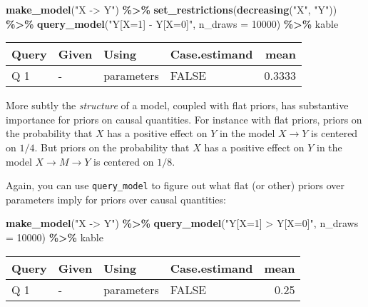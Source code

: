 \documentclass[
  12pt,
]{book}
\newenvironment{Shaded}{\begin{snugshade}}{\end{snugshade}}
\newcommand{\AttributeTok}[1]{\textcolor[rgb]{0.13,0.29,0.53}{#1}}
\newcommand{\DecValTok}[1]{\textcolor[rgb]{0.00,0.00,0.81}{#1}}
\newcommand{\FunctionTok}[1]{\textcolor[rgb]{0.13,0.29,0.53}{\textbf{#1}}}
\newcommand{\NormalTok}[1]{#1}
\newcommand{\SpecialCharTok}[1]{\textcolor[rgb]{0.81,0.36,0.00}{\textbf{#1}}}
\newcommand{\StringTok}[1]{\textcolor[rgb]{0.31,0.60,0.02}{#1}}
\begin{document}
\begin{Shaded}
\begin{Highlighting}[]
\FunctionTok{make\_model}\NormalTok{(}\StringTok{"X {-}\textgreater{} Y"}\NormalTok{) }\SpecialCharTok{\%\textgreater{}\%}
  \FunctionTok{set\_restrictions}\NormalTok{(}\FunctionTok{decreasing}\NormalTok{(}\StringTok{"X"}\NormalTok{, }\StringTok{"Y"}\NormalTok{)) }\SpecialCharTok{\%\textgreater{}\%}
  \FunctionTok{query\_model}\NormalTok{(}\StringTok{"Y[X=1] {-} Y[X=0]"}\NormalTok{, }\AttributeTok{n\_draws =} \DecValTok{10000}\NormalTok{) }\SpecialCharTok{\%\textgreater{}\%}
\NormalTok{  kable}
\end{Highlighting}
\end{Shaded}

\begin{tabular}{l|l|l|l|r}
\hline
Query & Given & Using & Case.estimand & mean\\
\hline
Q 1 & - & parameters & FALSE & 0.3333\\
\hline
\end{tabular}

More subtly the \emph{structure} of a model, coupled with flat priors, has substantive importance for priors on causal quantities. For instance with flat priors, priors on the probability that \(X\) has a positive effect on \(Y\) in the model \(X \rightarrow Y\) is centered on \(1/4\). But priors on the probability that \(X\) has a positive effect on \(Y\) in the model \(X \rightarrow M \rightarrow Y\) is centered on \(1/8\).

Again, you can use \texttt{query\_model} to figure out what flat (or other) priors over parameters imply for priors over causal quantities:

\begin{Shaded}
\begin{Highlighting}[]
\FunctionTok{make\_model}\NormalTok{(}\StringTok{"X {-}\textgreater{} Y"}\NormalTok{) }\SpecialCharTok{\%\textgreater{}\%}
  \FunctionTok{query\_model}\NormalTok{(}\StringTok{"Y[X=1] \textgreater{} Y[X=0]"}\NormalTok{, }\AttributeTok{n\_draws =} \DecValTok{10000}\NormalTok{) }\SpecialCharTok{\%\textgreater{}\%}
\NormalTok{  kable}
\end{Highlighting}
\end{Shaded}

\begin{tabular}{l|l|l|l|r}
\hline
Query & Given & Using & Case.estimand & mean\\
\hline
Q 1 & - & parameters & FALSE & 0.25\\
\hline
\end{tabular}
\end{document}
